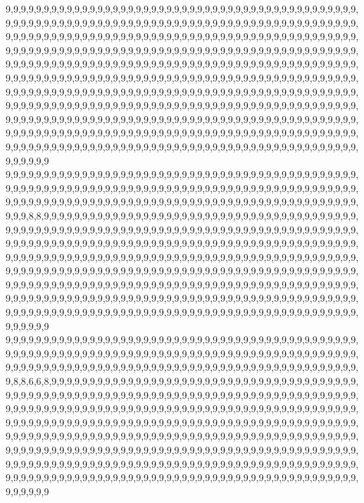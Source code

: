 9,9,9,9,9,9,9,9,9,9,9,9,9,9,9,9,9,9,9,9,9,9,9,9,9,9,9,9,9,9,9,9,9,9,9,9,9,9,9,9,9,9,9,9,9,9,9,9,9,9,9,9,9,9,9,9,9,9,9,9,9,9,9,9,9,9,9,9,9,9,9,9,9,9,9,9,9,9,9,9,9,9,9,9,9,9,9,9,9,9,9,9,9,9,9,9,9,9,9,9,9,9,9,9,9,9,9,9,9,9,9,9,9,9,9,9,9,9,9,9,9,9,9,9,9,9,9,9,9,9,9,9,9,9,9,9,9,9,9,9,9,9,9,9,9,9,9,9,9,9,9,9,9,9,9,9,9,9,9,9,9,9,9,9,9,9,9,9,9,9,9,9,9,9,9,9,9,9,9,9,9,9,9,9,9,9,9,9,9,9,9,9,9,9,9,9,9,9,9,9,9,9,9,9,9,9,9,9,9,9,9,9,9,9,9,9,9,9,9,9,9,9,9,9,9,9,9,9,9,9,9,9,9,9,9,9,9,9,9,9,9,9,9,9,9,9,9,9,9,9,9,9,9,9,9,9,9,9,9,9,9,9,9,9,9,9,9,9,9,9,9,9,9,9,9,9,9,9,9,9,9,9,9,9,9,9,9,9,9,9,9,9,9,9,9,9,9,9,9,9,9,9,9,9,9,9,9,9,9,9,9,9,9,9,9,9,9,9,9,9,9,9,9,9,9,9,9,9,9,9,9,9,9,9,9,9,9,9,9,9,9,9,9,9,9,9,9,9,9,9,9,9,9,9,9,9,9,9,9,9,9,9,9,9,9,9,9,9,9,9,9,9,9,9,9,9,9,9,9,9,9,9,9,9,9,9,9,9,9,9,9,9,9,9,9,9,9,9,9,9,9,9,9,9,9,9,9,9,9,9,9,9,9,9,9,9,9,9,9,9,9,9,9,9,9,9,9,9,9,9,9,9,9,9,9,9,9,9,9,9,9,9,9,9,9,9,9,9,9,9,9,9,9,9,9,9,9,9,9,9,9,9,9,9,9,9,9,9,9,9,9,9,9,9,9,9,9,9,9,9,9,9,9,9,9,9,9,9,9,9,9,9,9,9,9,9,9,9,9,9,9,9,9,9,9,9,9,9,9,9,9,9
9,9,9,9,9,9,9,9,9,9,9,9,9,9,9,9,9,9,9,9,9,9,9,9,9,9,9,9,9,9,9,9,9,9,9,9,9,9,9,9,9,9,9,9,9,9,9,9,9,9,9,9,9,9,9,9,9,9,9,9,9,9,9,9,9,9,9,9,9,9,9,9,9,9,9,9,9,9,9,9,9,9,9,9,9,9,9,9,9,9,9,9,9,9,9,9,9,9,9,9,9,9,9,9,9,9,9,9,9,9,9,9,9,9,9,9,9,9,9,9,9,9,9,9,9,9,9,9,9,9,9,9,9,9,9,9,9,9,9,9,9,8,8,9,9,9,9,9,9,9,9,9,9,9,9,9,9,9,9,9,9,9,9,9,9,9,9,9,9,9,9,9,9,9,9,9,9,9,9,9,9,9,9,9,9,9,9,9,9,9,9,9,9,9,9,9,9,9,9,9,9,9,9,9,9,9,9,9,9,9,9,9,9,9,9,9,9,9,9,9,9,9,9,9,9,9,9,9,9,9,9,9,9,9,9,9,9,9,9,9,9,9,9,9,9,9,9,9,9,9,9,9,9,9,9,9,9,9,9,9,9,9,9,9,9,9,9,9,9,9,9,9,9,9,9,9,9,9,9,9,9,9,9,9,9,9,9,9,9,9,9,9,9,9,9,9,9,9,9,9,9,9,9,9,9,9,9,9,9,9,9,9,9,9,9,9,9,9,9,9,9,9,9,9,9,9,9,9,9,9,9,9,9,9,9,9,9,9,9,9,9,9,9,9,9,9,9,9,9,9,9,9,9,9,9,9,9,9,9,9,9,9,9,9,9,9,9,9,9,9,9,9,9,9,9,9,9,9,9,9,9,9,9,9,9,9,9,9,9,9,9,9,9,9,9,9,9,9,9,9,9,9,9,9,9,9,9,9,9,9,9,9,9,9,9,9,9,9,9,9,9,9,9,9,9,9,9,9,9,9,9,9,9,9,9,9,9,9,9,9,9,9,9,9,9,9,9,9,9,9,9,9,9,9,9,9,9,9,9,9,9,9,9,9,9,9,9,9,9,9,9,9,9,9,9,9,9,9,9,9,9,9,9,9,9,9,9,9,9,9,9,9,9,9,9,9,9,9,9,9,9,9,9,9,9,9,9,9,9,9,9,9
9,9,9,9,9,9,9,9,9,9,9,9,9,9,9,9,9,9,9,9,9,9,9,9,9,9,9,9,9,9,9,9,9,9,9,9,9,9,9,9,9,9,9,9,9,9,9,9,9,9,9,9,9,9,9,9,9,9,9,9,9,9,9,9,9,9,9,9,9,9,9,9,9,9,9,9,9,9,9,9,9,9,9,9,9,9,9,9,9,9,9,9,9,9,9,9,9,9,9,9,9,9,9,9,9,9,9,9,9,9,9,9,9,9,9,9,9,9,9,9,9,9,9,9,9,9,9,9,9,9,9,9,9,9,9,9,9,9,9,8,8,6,6,8,9,9,9,9,9,9,9,9,9,9,9,9,9,9,9,9,9,9,9,9,9,9,9,9,9,9,9,9,9,9,9,9,9,9,9,9,9,9,9,9,9,9,9,9,9,9,9,9,9,9,9,9,9,9,9,9,9,9,9,9,9,9,9,9,9,9,9,9,9,9,9,9,9,9,9,9,9,9,9,9,9,9,9,9,9,9,9,9,9,9,9,9,9,9,9,9,9,9,9,9,9,9,9,9,9,9,9,9,9,9,9,9,9,9,9,9,9,9,9,9,9,9,9,9,9,9,9,9,9,9,9,9,9,9,9,9,9,9,9,9,9,9,9,9,9,9,9,9,9,9,9,9,9,9,9,9,9,9,9,9,9,9,9,9,9,9,9,9,9,9,9,9,9,9,9,9,9,9,9,9,9,9,9,9,9,9,9,9,9,9,9,9,9,9,9,9,9,9,9,9,9,9,9,9,9,9,9,9,9,9,9,9,9,9,9,9,9,9,9,9,9,9,9,9,9,9,9,9,9,9,9,9,9,9,9,9,9,9,9,9,9,9,9,9,9,9,9,9,9,9,9,9,9,9,9,9,9,9,9,9,9,9,9,9,9,9,9,9,9,9,9,9,9,9,9,9,9,9,9,9,9,9,9,9,9,9,9,9,9,9,9,9,9,9,9,9,9,9,9,9,9,9,9,9,9,9,9,9,9,9,9,9,9,9,9,9,9,9,9,9,9,9,9,9,9,9,9,9,9,9,9,9,9,9,9,9,9,9,9,9,9,9,9,9,9,9,9,9,9,9,9,9,9,9,9,9,9,9,9,9,9,9,9,9,9,9,9,9
